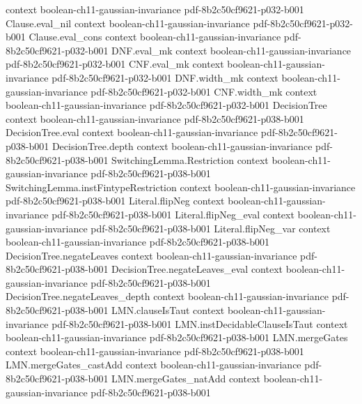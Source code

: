 \begin{lemma}
  {context}
  {boolean-ch11-gaussian-invariance}
  {pdf-8b2c50cf9621-p032-b001}
\proofstep
  {Clause.eval_nil}
  {context}
  {boolean-ch11-gaussian-invariance}
  {pdf-8b2c50cf9621-p032-b001}
\proofstep
  {Clause.eval_cons}
  {context}
  {boolean-ch11-gaussian-invariance}
  {pdf-8b2c50cf9621-p032-b001}
\proofstep
  {DNF.eval_mk}
  {context}
  {boolean-ch11-gaussian-invariance}
  {pdf-8b2c50cf9621-p032-b001}
\proofstep
  {CNF.eval_mk}
  {context}
  {boolean-ch11-gaussian-invariance}
  {pdf-8b2c50cf9621-p032-b001}
\proofstep
  {DNF.width_mk}
  {context}
  {boolean-ch11-gaussian-invariance}
  {pdf-8b2c50cf9621-p032-b001}
\proofstep
  {CNF.width_mk}
  {context}
  {boolean-ch11-gaussian-invariance}
  {pdf-8b2c50cf9621-p032-b001}
\proofstep
  {DecisionTree}
  {context}
  {boolean-ch11-gaussian-invariance}
  {pdf-8b2c50cf9621-p038-b001}
\proofstep
  {DecisionTree.eval}
  {context}
  {boolean-ch11-gaussian-invariance}
  {pdf-8b2c50cf9621-p038-b001}
\proofstep
  {DecisionTree.depth}
  {context}
  {boolean-ch11-gaussian-invariance}
  {pdf-8b2c50cf9621-p038-b001}
\proofstep
  {SwitchingLemma.Restriction}
  {context}
  {boolean-ch11-gaussian-invariance}
  {pdf-8b2c50cf9621-p038-b001}
\proofstep
  {SwitchingLemma.instFintypeRestriction}
  {context}
  {boolean-ch11-gaussian-invariance}
  {pdf-8b2c50cf9621-p038-b001}
\proofstep
  {Literal.flipNeg}
  {context}
  {boolean-ch11-gaussian-invariance}
  {pdf-8b2c50cf9621-p038-b001}
\proofstep
  {Literal.flipNeg_eval}
  {context}
  {boolean-ch11-gaussian-invariance}
  {pdf-8b2c50cf9621-p038-b001}
\proofstep
  {Literal.flipNeg_var}
  {context}
  {boolean-ch11-gaussian-invariance}
  {pdf-8b2c50cf9621-p038-b001}
\proofstep
  {DecisionTree.negateLeaves}
  {context}
  {boolean-ch11-gaussian-invariance}
  {pdf-8b2c50cf9621-p038-b001}
\proofstep
  {DecisionTree.negateLeaves_eval}
  {context}
  {boolean-ch11-gaussian-invariance}
  {pdf-8b2c50cf9621-p038-b001}
\proofstep
  {DecisionTree.negateLeaves_depth}
  {context}
  {boolean-ch11-gaussian-invariance}
  {pdf-8b2c50cf9621-p038-b001}
\proofstep
  {LMN.clauseIsTaut}
  {context}
  {boolean-ch11-gaussian-invariance}
  {pdf-8b2c50cf9621-p038-b001}
\proofstep
  {LMN.instDecidableClauseIsTaut}
  {context}
  {boolean-ch11-gaussian-invariance}
  {pdf-8b2c50cf9621-p038-b001}
\proofstep
  {LMN.mergeGates}
  {context}
  {boolean-ch11-gaussian-invariance}
  {pdf-8b2c50cf9621-p038-b001}
\proofstep
  {LMN.mergeGates_castAdd}
  {context}
  {boolean-ch11-gaussian-invariance}
  {pdf-8b2c50cf9621-p038-b001}
\proofstep
  {LMN.mergeGates_natAdd}
  {context}
  {boolean-ch11-gaussian-invariance}
  {pdf-8b2c50cf9621-p038-b001}

\end{lemma}
